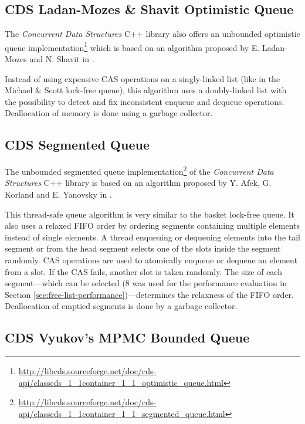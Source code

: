 \subsection[CDS OptimisticQueue]{CDS Ladan-Mozes \& Shavit Optimistic Queue} \label{subsec:cds-optimistic}

	The \textit{Concurrent Data Structures} C++ library also offers an unbounded optimistic queue implementation\footnote{\url{http://libcds.sourceforge.net/doc/cds-api/classcds\_1\_1container\_1\_1\_optimistic\_queue.html}} which is based on an algorithm proposed by E. Ladan-Mozes and N. Shavit in \cite{Ladan-Mozes:2004}.
	
	Instead of using expensive CAS operations on a singly-linked list (like in the Michael \& Scott lock-free queue), this algorithm uses a doubly-linked list with the possibility to detect and fix inconsistent enqueue and dequeue operations. Deallocation of memory is done using a garbage collector.

\subsection[CDS SegmentedQueue]{CDS Segmented Queue} \label{subsec:cds-segmented}

	The unbounded segmented queue implementation\footnote{\url{http://libcds.sourceforge.net/doc/cds-api/classcds\_1\_1container\_1\_1\_segmented\_queue.html}} of the \textit{Concurrent Data Structures} C++ library is based on an algorithm proposed by Y. Afek, G. Korland and E. Yanovsky in \cite{Afek:2010}.
	
	This thread-safe queue algorithm is very similar to the basket lock-free queue. It also uses a relaxed FIFO order by ordering segments containing multiple elements instead of single elements. A thread enqueuing or dequeuing elements into the tail segment or from the head segment selects one of the slots inside the segment randomly. CAS operations are used to atomically enqueue or dequeue an element from a slot. If the CAS fails, another slot is taken randomly. The size of each segment---which can be selected ($8$ was used for the performance evaluation in Section \ref{sec:free-list-performance})---determines the relaxness of the FIFO order. Deallocation of emptied segments is done by a garbage collector.

\subsection[CDS VyukovMPMCCycleQueue]{CDS Vyukov's MPMC Bounded Queue} \label{subsec:cds-vyukovmpmccycle}

